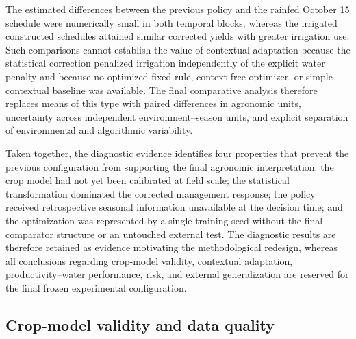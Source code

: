 \documentclass[times,final,authoryear]{elsarticle}
\begin{document}
The estimated differences between the previous policy and the rainfed October 15 schedule were numerically small in both temporal blocks, whereas the irrigated constructed schedules attained similar corrected yields with greater irrigation use. Such comparisons cannot establish the value of contextual adaptation because the statistical correction penalized irrigation independently of the explicit water penalty and because no optimized fixed rule, context-free optimizer, or simple contextual baseline was available. The final comparative analysis therefore replaces means of this type with paired differences in agronomic units, uncertainty across independent environment--season units, and explicit separation of environmental and algorithmic variability.

Taken together, the diagnostic evidence identifies four properties that prevent the previous configuration from supporting the final agronomic interpretation: the crop model had not yet been calibrated at field scale; the statistical transformation dominated the corrected management response; the policy received retrospective seasonal information unavailable at the decision time; and the optimization was represented by a single training seed without the final comparator structure or an untouched external test. The diagnostic results are therefore retained as evidence motivating the methodological redesign, whereas all conclusions regarding crop-model validity, contextual adaptation, productivity--water performance, risk, and external generalization are reserved for the final frozen experimental configuration.

\subsection{Crop-model validity and data quality}
\label{subres_validity}
\end{document}
